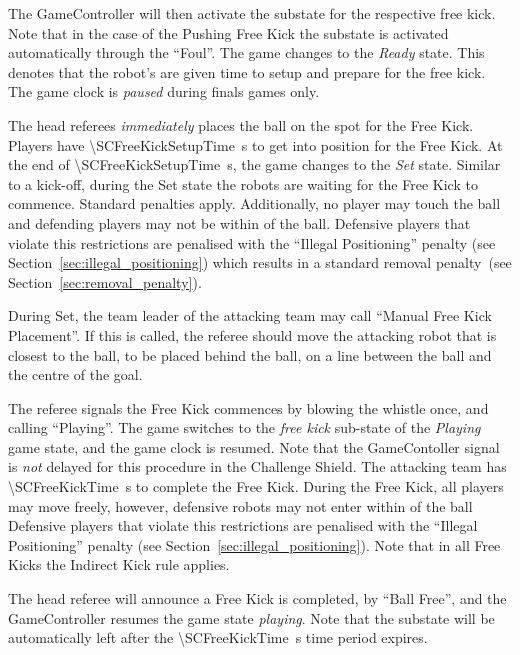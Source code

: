 The GameController will then activate the substate for the respective free kick. Note that in the case of the Pushing Free Kick the substate is activated automatically through the ``Foul''.
The game changes to the \textit{Ready} state.
This denotes that the robot's are given time to setup and prepare for the free kick.
The game clock is \textit{paused} during finals games only.

The head referees \emph{immediately} places the ball on the spot for the Free Kick.
Players have \qty{\SCFreeKickSetupTime}{\second} to get into position for the Free Kick.
At the end of \qty{\SCFreeKickSetupTime}{\second}, the game changes to the \textit{Set} state.
Similar to a kick-off, during the Set state the robots are waiting for the Free Kick to commence.
Standard penalties apply.
Additionally, no player may touch the ball and defending players may not be within \FreeKickRadius of the ball.
Defensive players that violate this restrictions are penalised with the ``Illegal Positioning'' penalty (see Section~\ref{sec:illegal_positioning}) which results in a standard removal penalty~(see Section~\ref{sec:removal_penalty}).

During Set, the team leader of the attacking team may call ``Manual Free Kick Placement''.
If this is called, the referee should move the attacking robot that is closest to the ball, to be placed \SCFreeKickDistance behind the ball, on a line between the ball and the centre of the goal.

The referee signals the Free Kick commences by blowing the whistle once, and calling ``Playing''.
The game switches to the \textit{free kick} sub-state of the \textit{Playing} game state, and the game clock is resumed.
Note that the GameContoller signal is \emph{not} delayed for this procedure in the Challenge Shield.
The attacking team has \qty{\SCFreeKickTime}{\second} to complete the Free Kick.
During the Free Kick, all players may move freely, however, defensive robots may not enter within \FreeKickRadius of the ball Defensive players that violate this restrictions are penalised with the ``Illegal Positioning'' penalty (see Section~\ref{sec:illegal_positioning}).
Note that in all Free Kicks the Indirect Kick rule applies.

The head referee will announce a Free Kick is completed, by ``Ball Free'', and the GameController resumes the game state \emph{playing}. Note that the substate will be automatically left after the \qty{\SCFreeKickTime}{\second} time period expires.

